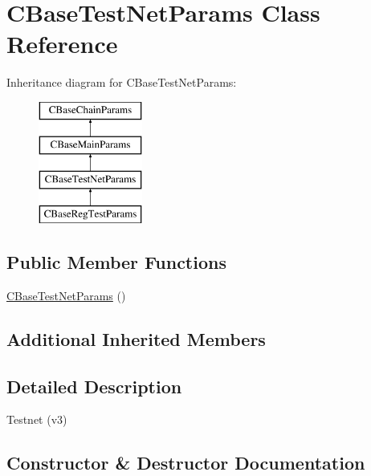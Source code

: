 \hypertarget{class_c_base_test_net_params}{}\section{C\+Base\+Test\+Net\+Params Class Reference}
\label{class_c_base_test_net_params}
Inheritance diagram for C\+Base\+Test\+Net\+Params\+:\begin{figure}[H]
\begin{center}
\leavevmode
\includegraphics[height=4.000000cm]{class_c_base_test_net_params}
\end{center}
\end{figure}
\subsection*{Public Member Functions}
\begin{DoxyCompactItemize}
\item 
\mbox{\hyperlink{class_c_base_test_net_params_ae95167a7de928f49ce78840c1569ce16}{C\+Base\+Test\+Net\+Params}} ()
\end{DoxyCompactItemize}
\subsection*{Additional Inherited Members}


\subsection{Detailed Description}
Testnet (v3) 

\subsection{Constructor \& Destructor Documentation}
\mbox{\label{class_c_base_test_net_params_ae95167a7de928f49ce78840c1569ce16}} 
